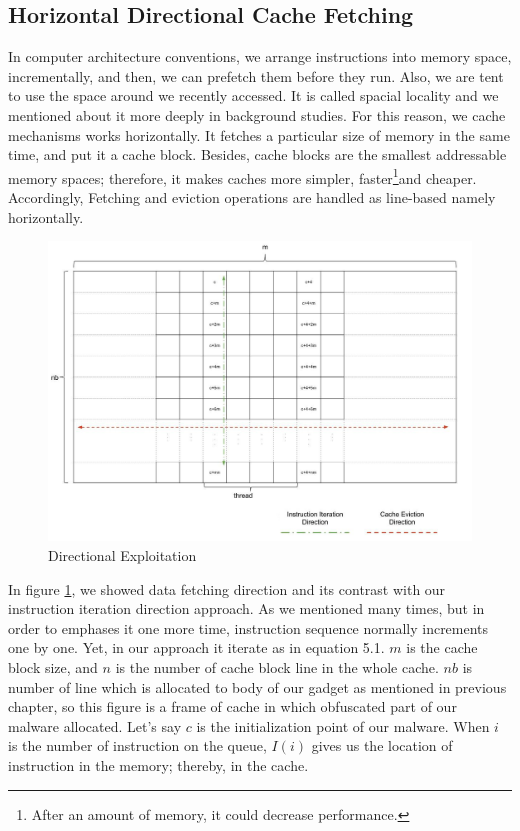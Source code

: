 \subsection{Horizontal Directional Cache Fetching}
In computer architecture conventions, we arrange instructions into memory space, incrementally, and then, we can prefetch them before they run. Also, we are tent to use the space around we recently accessed. It is called spacial locality and we mentioned about it more deeply in background studies. For this reason, we cache mechanisms works horizontally. It fetches a particular size of memory in the same time, and put it a cache block. Besides, cache blocks are the smallest addressable memory spaces; therefore, it makes caches more simpler, faster\footnote{After an amount of memory, it could decrease performance.\cite{ComputerArchCoursera} }and cheaper. Accordingly, Fetching and eviction operations are handled as line-based namely horizontally. 
	\begin{figure}[h!]
	    \centering
	    \includegraphics[width=1\textwidth]{img/vertical_instruction_iteration.jpg}
	    \caption{Directional Exploitation}
	    \label{fig:veriticaldirection}
	\end{figure}
In figure \ref{fig:veriticaldirection}, we showed data fetching direction and its contrast with our instruction iteration direction approach. As we mentioned many times, but in order to emphases it one more time, instruction sequence normally increments one by one. Yet, in our approach it iterate as in equation 5.1. $m$ is the cache block size, and $n$ is the number of cache block line in the whole cache. $nb$ is number of line which is allocated to body of our gadget as mentioned in previous chapter, so this figure is a frame of cache in which obfuscated part of our malware allocated. Let's say $c$ is the initialization point of our malware. When $i$ is the number of instruction on the queue, $I(i)$ gives us the location of instruction in the memory; thereby, in the cache. 
